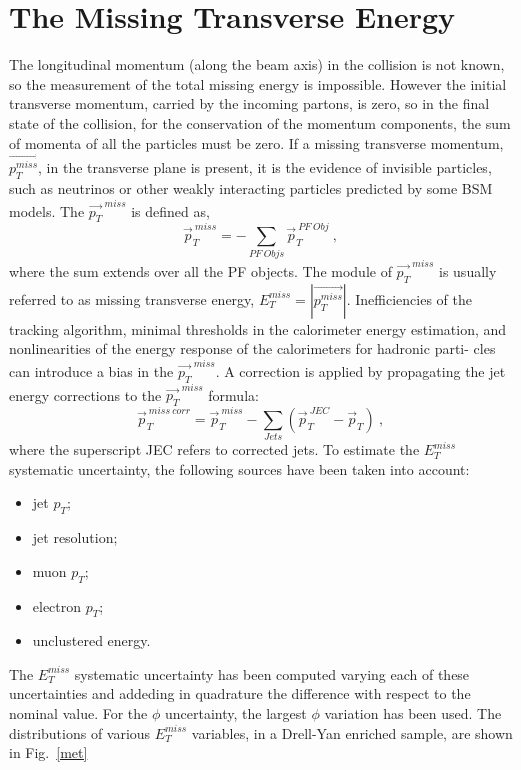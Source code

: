 \section{The Missing Transverse Energy}
The longitudinal momentum (along the beam axis) in the collision is not known, so the measurement of the total missing
energy is impossible.
However the initial transverse momentum, carried by the incoming partons, is zero, so in the final state of the collision, for the conservation of the momentum
components, the sum of momenta of all the particles must be zero.
If a missing transverse momentum, $\vec{p_T^{miss}}$, in the transverse plane is present, it is the evidence of invisible particles, such as neutrinos or other weakly interacting particles predicted by some BSM models.
The $\vec{p_T}^{\: miss}$ is defined as,
\begin{equation}
\vec{p}_T^{\: miss}= -\sum_{PF\: Objs} \vec{p}_T^{\:PF \: Obj} \: ,
\end{equation}
where the sum extends over all the PF objects. The module of $\vec{p_T}^{\: miss}$ is usually referred to as missing transverse energy, $E_T^{miss}=|\vec{p_T^{miss}}|$.
Inefficiencies of the tracking algorithm, minimal thresholds in the calorimeter energy
estimation, and nonlinearities of the energy response of the calorimeters for hadronic parti-
cles can introduce a bias in the $\vec{p_T}^{\: miss}$. A correction is applied by propagating
the jet energy corrections to the $\vec{p_T}^{\: miss}$ formula:
\begin{equation}
\vec{p}_T^{\:miss \: corr}= \vec{p}_T^{\:miss} -\sum_{Jets}( \vec{p}_T^{\:JEC} -\vec{p}_T) \: ,
\end{equation}
where the superscript JEC refers to corrected jets.
To estimate the $E_T^{miss}$  systematic uncertainty, the following sources have been taken into account:
\begin{itemize}
\item jet $p_T$;
\item jet resolution;
\item muon  $p_T$;
\item electron $p_T$;
\item unclustered energy.
\end{itemize}
The $E_T^{miss}$ systematic uncertainty has been computed varying each of these uncertainties and addeding in quadrature the
difference with respect to the nominal value. For the $\phi$ uncertainty, the largest
$\phi$ variation has been used.
The distributions of various  $E_T^{miss}$ variables, in a Drell-Yan enriched sample, are shown in Fig.~\ref{met}
